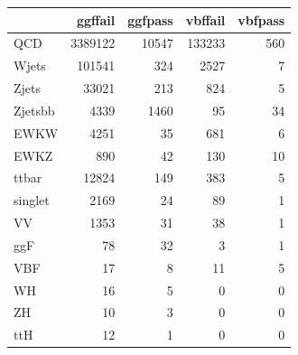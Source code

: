 \begin{tabular}{lrrrr}
\toprule
 & ggffail & ggfpass & vbffail & vbfpass \\
\midrule
QCD & 3389122 & 10547 & 133233 & 560 \\
Wjets & 101541 & 324 & 2527 & 7 \\
Zjets & 33021 & 213 & 824 & 5 \\
Zjetsbb & 4339 & 1460 & 95 & 34 \\
EWKW & 4251 & 35 & 681 & 6 \\
EWKZ & 890 & 42 & 130 & 10 \\
ttbar & 12824 & 149 & 383 & 5 \\
singlet & 2169 & 24 & 89 & 1 \\
VV & 1353 & 31 & 38 & 1 \\
ggF & 78 & 32 & 3 & 1 \\
VBF & 17 & 8 & 11 & 5 \\
WH & 16 & 5 & 0 & 0 \\
ZH & 10 & 3 & 0 & 0 \\
ttH & 12 & 1 & 0 & 0 \\
\bottomrule
\end{tabular}

